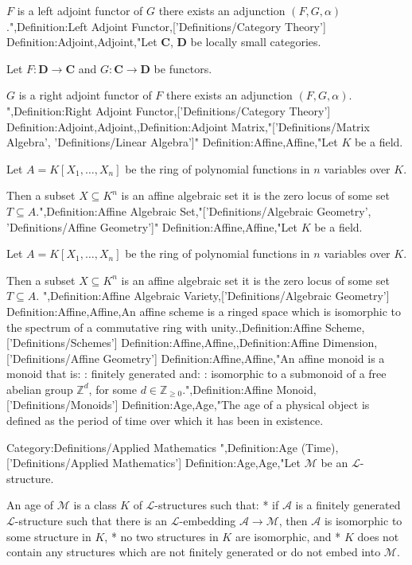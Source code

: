 $F$ is a left adjoint functor of $G$  there exists an adjunction $\left( F, G, \alpha \right)$.",Definition:Left Adjoint Functor,['Definitions/Category Theory']
Definition:Adjoint,Adjoint,"Let $\mathbf C$, $\mathbf D$ be locally small categories.

Let $F : \mathbf D \to \mathbf C$ and $G : \mathbf C \to \mathbf D$ be functors.

$G$ is a right adjoint functor of $F$  there exists an adjunction $\left( F, G, \alpha \right)$.
",Definition:Right Adjoint Functor,['Definitions/Category Theory']
Definition:Adjoint,Adjoint,,Definition:Adjoint Matrix,"['Definitions/Matrix Algebra', 'Definitions/Linear Algebra']"
Definition:Affine,Affine,"Let $K$ be a field.

Let $A = K \left[ X_1, \ldots, X_n \right]$ be the ring of polynomial functions in $n$ variables over $K$.


Then a subset $X \subseteq K^n$ is an affine algebraic set  it is the zero locus of some set $T \subseteq A$.",Definition:Affine Algebraic Set,"['Definitions/Algebraic Geometry', 'Definitions/Affine Geometry']"
Definition:Affine,Affine,"Let $K$ be a field.

Let $A = K \left[ X_1, \ldots, X_n \right]$ be the ring of polynomial functions in $n$ variables over $K$.


Then a subset $X \subseteq K^n$ is an affine algebraic set  it is the zero locus of some set $T \subseteq A$.
",Definition:Affine Algebraic Variety,['Definitions/Algebraic Geometry']
Definition:Affine,Affine,An affine scheme is a ringed space which is isomorphic to the spectrum of a commutative ring with unity.,Definition:Affine Scheme,['Definitions/Schemes']
Definition:Affine,Affine,,Definition:Affine Dimension,['Definitions/Affine Geometry']
Definition:Affine,Affine,"An affine monoid is a monoid that is:
: finitely generated
and:
: isomorphic to a submonoid of a free abelian group $\mathbb Z^d$, for some $d \in \mathbb Z_{\ge 0}$.",Definition:Affine Monoid,['Definitions/Monoids']
Definition:Age,Age,"The age of a physical object is defined as the period of time over which it has been in existence.


Category:Definitions/Applied Mathematics
",Definition:Age (Time),['Definitions/Applied Mathematics']
Definition:Age,Age,"Let $\mathcal M$ be an $\mathcal L$-structure.


An age of $\mathcal M$ is a class $K$ of $\mathcal L$-structures such that:
* if $\mathcal A$ is a finitely generated $\mathcal L$-structure such that there is an $\mathcal L$-embedding $\mathcal A \to \mathcal M$, then $\mathcal A$ is isomorphic to some structure in $K$,
* no two structures in $K$ are isomorphic, and
* $K$ does not contain any structures which are not finitely generated or do not embed into $\mathcal M$.

